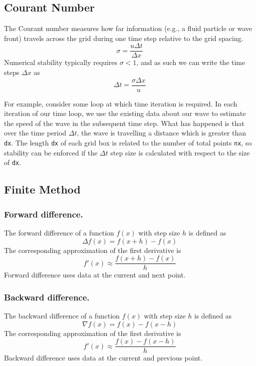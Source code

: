 \documentclass[../../../main.tex]{subfiles}
\begin{document}
\subsection{Courant Number}
The Courant number measures how far information (e.g., a fluid particle or wave front) travels across the grid during one time step relative to the grid spacing.
\begin{equation*}
    \sigma=\frac{u \Delta t}{\Delta x}
\end{equation*}
Numerical stability typically requires $\sigma<1$, and as such we can write the time steps $\Delta x$ as
\begin{equation*}
    \Delta t=\frac{\sigma \Delta x }{u}
\end{equation*}

For example, consider some loop at which time iteration is required.
In each iteration of our time loop, we use the existing data about our wave to estimate the speed of the wave in the subsequent time step.
What has happened is that over the time period $\Delta t$, the wave is travelling a distance which is greater than \verb|dx|.  The length \verb|dx| of each grid box is related to the number of total points \verb|nx|, so stability can be enforced if the $\Delta t$ step size is calculated with respect to the size of \verb|dx|.

\subsection{Finite Method}
\subsubsection{Forward difference.}
The forward difference of a function $f(x)$ with step size $h$ is defined as
\begin{equation*}
    \Delta f(x)=f(x+h)-f(x)
\end{equation*}
The corresponding approximation of the first derivative is
\begin{equation*}
    f'(x)\approx \frac{f(x+h )-f(x )}{h}
\end{equation*}
Forward difference uses data at the current and next point.

\subsubsection{Backward difference.}
The backward difference of a function $f(x)$ with step size $h$ is defined as
\begin{equation*}
    \nabla f(x)=f(x)-f(x-h)
\end{equation*}
The corresponding approximation of the first derivative is
\begin{equation*}
    f'(x)\approx \frac{f(x )-f(x-h )}{h}
\end{equation*}
Backward difference uses data at the current and previous point.
\end{document}
